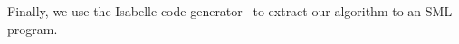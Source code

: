 \documentclass[smallcondensed]{svjour3}     %
\newcommand{\isai}{\lstinline[language=isabelle,basicstyle=\normalsize\ttfamily\slshape]}
\begin{document}
  
  Finally, we use the Isabelle code generator~\cite{Haft09,HaNi10} to extract our algorithm to an SML program.
  
  
%   
%   
%   
%   
%   
%   
%   
%   
%   
%   
%       
\end{document}
